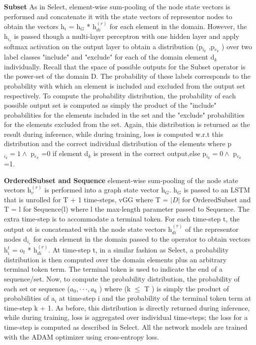 \documentclass{article}
\begin{document}
\textbf{Subset} As in Select, element-wise sum-pooling of the node state vectors is performed and concatenate it with the state vectors of representor nodes to obtain the vectors h$_i$ = h$_G$ * h$^{(r)}_{di}$ for each element in the domain. However, the h$_{i_s}$ is passed though a multi-layer perceptron with one hidden layer and apply softmax activation on the output layer to obtain a distribution (p$_{i_k}$ ,p$_{e_k}$ ) over two label classes "include" and "exclude" for each of the domain element d$_k$ individually. Recall that the space of possible outputs for the Subset operator is the power-set of the domain D. The probability of these labels corresponds to the probability with which an element is included and excluded from the output set respectively. To compute the probability distribution, the probability of each possible output set is computed as simply the product of the "include" probabilities for the elements included in the set and the "exclude" probabilities for the elements excluded from the set. Again, this distribution is returned as the result during inference, while during training, loss is computed w.r.t this distribution and the correct individual distribution of the elements where p$_{i_k} = 1 \wedge $ p$_{e_k}$ =0 if element d$_k$ is present in the correct output,else p$_{i_k} = 0 \wedge $ p$_{e_k}$ =1.

\textbf{OrderedSubset and Sequence} element-wise sum-pooling of the node state vectors h$^{(r)}_v$ is performed into a graph state vector h$_G$. h$_G$ is passed to an LSTM that is unrolled for T + 1 time-steps, vGG where T = $|D|$ for OrderedSubset and T = l for Sequence(l) where l the max-length parameter passed to Sequence. The extra time-step is to accommodate a terminal token. For each time-step t, the output ot is concatenated with the node state vectors h$^{(r)}_{di}$ of the representor nodes d$_{i_s}$ for each element in the domain passed to the operator to obtain vectors h$_i^t$ = o$_t$ * h$^{(r)}_{di}$. At time-step t, in a similar fashion as Select, a probability distribution is then computed over the domain elements plus an arbitrary terminal token term. The terminal token is used to indicate the end of a sequence/set. Now, to compute the probability distribution, the probability of each set or sequence ($a_0, · · · , a_k$ ) where (k $\leq$ T ) is simply the product of probabilities of a$_i$ at time-step i and the probability of the terminal token term at time-step k + 1. As before, this distribution is directly returned during inference, while during training, loss is aggregated over individual time-steps; the loss for a time-step is computed as described in Select. All the network models are trained with the ADAM optimizer  using cross-entropy loss.
\end{document}
